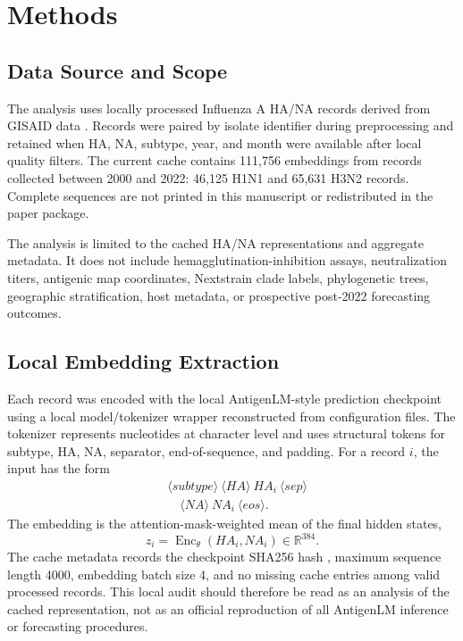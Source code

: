 \documentclass[11pt]{article}
\newcommand{\Enc}{\operatorname{Enc}}
\newcommand{\R}{\mathbb{R}}
\begin{document}
\section{Methods}

\subsection{Data Source and Scope}

The analysis uses locally processed Influenza A HA/NA records derived from GISAID data \cite{shu2017gisaid}. Records were paired by isolate identifier during preprocessing and retained when HA, NA, subtype, year, and month were available after local quality filters. The current cache contains 111,756 embeddings from records collected between 2000 and 2022: 46,125 H1N1 and 65,631 H3N2 records. Complete sequences are not printed in this manuscript or redistributed in the paper package.

The analysis is limited to the cached HA/NA representations and aggregate metadata. It does not include hemagglutination-inhibition assays, neutralization titers, antigenic map coordinates, Nextstrain clade labels, phylogenetic trees, geographic stratification, host metadata, or prospective post-2022 forecasting outcomes.

\subsection{Local Embedding Extraction}

Each record was encoded with the local AntigenLM-style prediction checkpoint  using a local model/tokenizer wrapper reconstructed from configuration files. The tokenizer represents nucleotides at character level and uses structural tokens for subtype, HA, NA, separator, end-of-sequence, and padding. For a record $i$, the input has the form
\[
\begin{aligned}
&\langle subtype\rangle \ \langle HA\rangle \ HA_i \ \langle sep\rangle \\
&\quad \langle NA\rangle \ NA_i \ \langle eos\rangle .
\end{aligned}
\]
The embedding is the attention-mask-weighted mean of the final hidden states,
\[
z_i=\Enc_{\theta}(HA_i,NA_i)\in\R^{384}.
\]
The cache metadata records the checkpoint SHA256 hash
, maximum sequence length 4000, embedding batch size 4, and no missing cache entries among valid processed records. This local audit should therefore be read as an analysis of the cached representation, not as an official reproduction of all AntigenLM inference or forecasting procedures.
\end{document}
